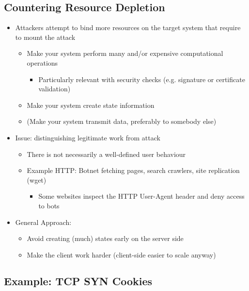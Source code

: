 \documentclass[openany]{book}
\begin{document}
\subsection{Countering Resource Depletion}

\begin{itemize}
    \item Attackers attempt to bind more resources on the target system that require to mount the attack
    \begin{itemize}
        \item Make your system perform many and/or expensive computational operations
        \begin{itemize}
            \item Particularly relevant with security checks (e.g. signature or certificate validation)
        \end{itemize}
        \item Make your system create state information
        \item (Make your system transmit data, preferably to somebody else)
    \end{itemize}
    \item Issue: distinguishing legitimate work from attack
    \begin{itemize}
        \item There is not necessarily a well-defined user behaviour
        \item Example HTTP: Botnet fetching pages, search crawlers, site replication (wget)
        \begin{itemize}
            \item Some websites inspect the HTTP User-Agent header and deny access to bots 
        \end{itemize}
    \end{itemize}
    \item General Approach:
    \begin{itemize}
        \item Avoid creating (much) states early on the server side
        \item Make the client work harder (client-side easier to scale anyway)
    \end{itemize}
\end{itemize}

\subsection{Example: TCP SYN Cookies}
\end{document}
